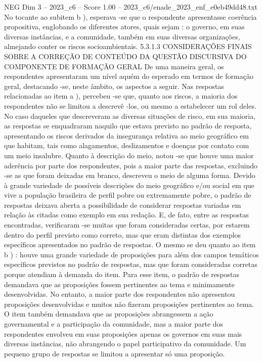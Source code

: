 \begin{textsample}{NEG Dim 3 – 2023\_c6 – Score 1.00 – 2023\_c6/enade\_2023\_enf\_e0eb49dd48.txt}
No tocante ao subitem b ), esperava -se que o respondente apresentasse coerência propositiva, englobando os diferentes atores, quais sejam : o governo, em suas diversas instâncias, e a comunidade, também em suas diversas organizações, almejando conter os riscos socioambientais. 5.3.1.3 CONSIDERAÇÕES FINAIS SOBRE A CORREÇÃO DE CONTEÚDO DA QUESTÃO DISCURSIVA DO COMPONENTE DE FORMAÇÃO GERAL De uma maneira geral, os respondentes apresentaram um nível aquém do esperado em termos de formação geral, destacando -se, neste âmbito, os aspectos a seguir.
Nas respostas relacionadas ao item a ), percebeu -se que, quanto aos riscos, a maioria dos respondentes não se limitou a descrevê -los, ou mesmo a estabelecer um rol deles.
No caso daqueles que descreveram as diversas situações de risco, em sua maioria, as respostas se enquadraram naquilo que estava previsto no padrão de resposta, apresentando os riscos derivados da insegurança relativa ao meio geográfico em que habitam, tais como alagamentos, deslizamentos e doenças por contato com um meio insalubre.
Quanto à descrição do meio, notou -se que houve uma maior aderência por parte dos respondentes, pois a maior parte das respostas, excluindo -se as que foram deixadas em branco, descreveu o meio de alguma forma.
Devido à grande variedade de possíveis descrições do meio geográfico e/ou social em que vive a população brasileira de perfil pobre ou extremamente pobre, o padrão de respostas deixava aberta a possibilidade de considerar respostas variadas em relação às citadas como exemplo em sua redação.
E, de fato, entre as respostas encontradas, verificaram -se muitas que foram consideradas certas, por estarem dentro do perfil previsto como correto, mas que eram distintas dos exemplos específicos apresentados no padrão de respostas.
O mesmo se deu quanto ao item b ) : houve uma grande variedade de proposições para além dos campos temáticos específicos previstos no padrão de respostas, mas que foram consideradas corretas porque atendiam à demanda do item.
Para esse item, o padrão de respostas demandava que as proposições fossem pertinentes ao tema e minimamente desenvolvidas.
No entanto, a maior parte dos respondentes não apresentou proposições desenvolvidas e muitos não fizeram proposições pertinentes ao tema.
O item também demandava que as proposições abrangessem a ação governamental e a participação da comunidade, mas a maior parte dos respondentes envolveu em suas proposições apenas os governos em suas mais diversas instâncias, não abrangendo o papel participativo da comunidade.
Um pequeno grupo de respostas se limitou a apresentar só uma proposição.

\end{textsample}
